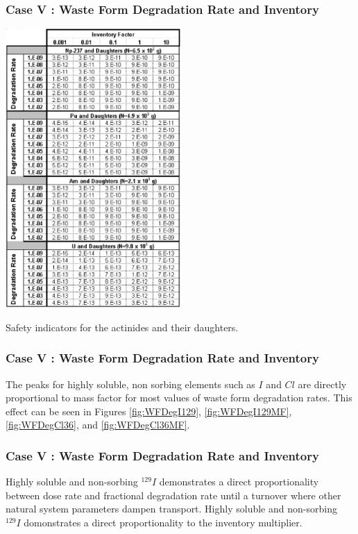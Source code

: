 \begin{frame}[c]
  \frametitle{Case V : Waste Form Degradation Rate and Inventory}
\begin{table}[h!]
\centering
\includegraphics[width=0.5\textwidth]{WFDegAndInv/IndicatorsActinides.eps}
\caption{Safety indicators for the actinides and their daughters.}
\label{tab:WFDegIndicatorsActinides}
\end{table}
\end{frame}

\begin{frame}[c]
  \frametitle{Case V : Waste Form Degradation Rate and Inventory}
The peaks for highly soluble, non sorbing elements such as $I$ and $Cl$
are directly proportional to mass factor for most 
values of waste form degradation rates. This effect can be seen in Figures 
\ref{fig:WFDegI129}, \ref{fig:WFDegI129MF}, \ref{fig:WFDegCl36}, and 
\ref{fig:WFDegCl36MF}. 
\end{frame}

\begin{frame}[c]
  \frametitle{Case V : Waste Form Degradation Rate and Inventory}


Highly soluble and non-sorbing $^{129}I$ demonstrates a direct proportionality between dose rate and 
fractional degradation rate until a turnover where other natural system 
parameters dampen transport. Highly soluble and non-sorbing $^{129}I$ domonstrates a direct 
proportionality to the inventory multiplier.

\end{frame}

